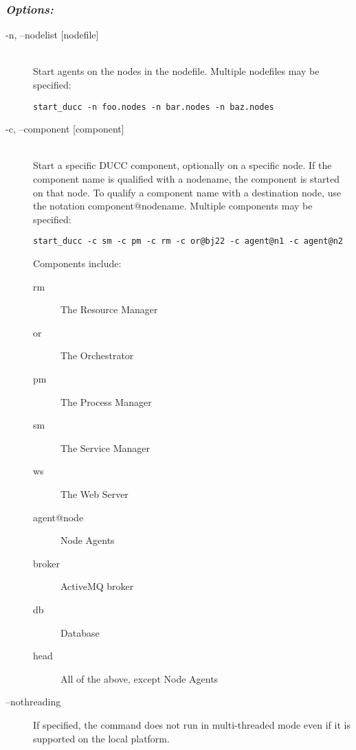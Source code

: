       \subsubsection{{\em Options: }}
      \begin{description}

        \item[-n, --nodelist {[nodefile] }] \hfill \\
          Start agents on the nodes in the nodefile. Multiple nodefiles may be specified: 
\begin{verbatim}
start_ducc -n foo.nodes -n bar.nodes -n baz.nodes 
\end{verbatim}
          

        \item[-c, --component {[component] }] \hfill \\
          Start a specific DUCC component, optionally on a specific node. If the component 
          name is qualified with a nodename, the component is started on that node. To qualify 
          a component name with a destination node, use the notation component@nodename. 
          Multiple components may be specified: 
\begin{verbatim}
start_ducc -c sm -c pm -c rm -c or@bj22 -c agent@n1 -c agent@n2 
\end{verbatim}
          
          Components include: 
          \begin{description}
            \item[rm] The Resource Manager
            \item[or]The Orchestrator
            \item[pm]The Process Manager
            \item[sm]The Service Manager
            \item[ws]The Web Server
            \item[agent@node] Node Agents
            \item[broker] ActiveMQ broker
            \item[db] Database
            \item[head] All of the above, except Node Agents
          \end{description}

          \item[--nothreading] If specified, the command does not run in multi-threaded mode
            even if it is supported on the local platform.

      \end{description}

